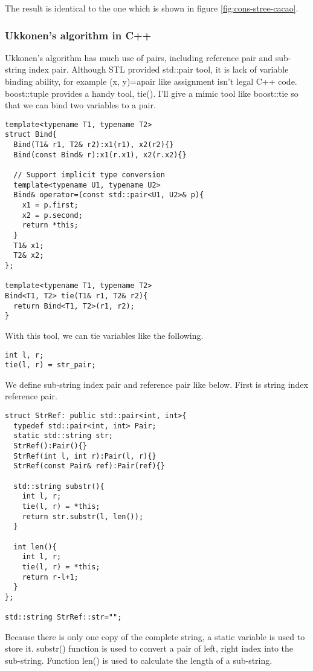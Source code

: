 \documentclass{article}
\begin{document}
The result is identical to the one which is shown in figure \ref{fig:cons-stree-cacao}.

\subsubsection*{Ukkonen's algorithm in C++}
\label{ukkonen-c++}
Ukkonen's algorithm has much use of pairs, including reference pair and 
sub-string index pair. Although STL provided std::pair tool, it is lack of
variable binding ability, for example (x, y)=apair like assignment isn't
legal C++ code. boost::tuple provides a handy tool, tie(). I'll give a mimic
tool like boost::tie so that we can bind two variables to a pair.

\lstset{language=C++}
\begin{lstlisting}
template<typename T1, typename T2>
struct Bind{
  Bind(T1& r1, T2& r2):x1(r1), x2(r2){}
  Bind(const Bind& r):x1(r.x1), x2(r.x2){}

  // Support implicit type conversion
  template<typename U1, typename U2>
  Bind& operator=(const std::pair<U1, U2>& p){
    x1 = p.first;
    x2 = p.second;
    return *this;
  }
  T1& x1;
  T2& x2;
};

template<typename T1, typename T2>
Bind<T1, T2> tie(T1& r1, T2& r2){ 
  return Bind<T1, T2>(r1, r2); 
}
\end{lstlisting}

With this tool, we can tie variables like the following.

\begin{lstlisting}
int l, r;
tie(l, r) = str_pair;
\end{lstlisting}

We define sub-string index pair and reference pair like below.
First is string index reference pair.

\begin{lstlisting}
struct StrRef: public std::pair<int, int>{
  typedef std::pair<int, int> Pair;
  static std::string str;
  StrRef():Pair(){}
  StrRef(int l, int r):Pair(l, r){}
  StrRef(const Pair& ref):Pair(ref){}

  std::string substr(){
    int l, r;
    tie(l, r) = *this;
    return str.substr(l, len());
  }

  int len(){ 
    int l, r;
    tie(l, r) = *this;
    return r-l+1; 
  }
};

std::string StrRef::str="";
\end{lstlisting}

Because there is only one copy of the complete string, a static variable
is used to store it. substr() function is used to convert a pair of left,
right index into the sub-string. Function len() is used to calculate the
length of a sub-string.
\end{document}
